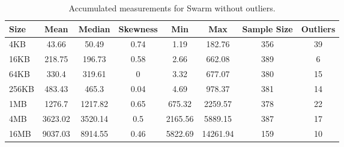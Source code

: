 \begin{table}[H]
\centering
\begin{small}
\caption{Accumulated measurements for Swarm without outliers.}
\begin{tabular}{@{}lccccccc@{}}
\toprule
Size & Mean & Median & Skewness & Min & Max & Sample Size & Outliers \\ \midrule
4KB & 43.66 & 50.49 & 0.74 & 1.19 & 182.76 & 356 & 39\\
16KB & 218.75 & 196.73 & 0.58 & 2.66 & 662.08 & 389 & 6\\
64KB & 330.4 & 319.61 & 0 & 3.32 & 677.07 & 380 & 15\\
256KB & 483.43 & 465.3 & 0.04 & 4.69 & 978.37 & 381 & 14\\
1MB & 1276.7 & 1217.82 & 0.65 & 675.32 & 2259.57 & 378 & 22\\
4MB & 3623.02 & 3520.14 & 0.5 & 2165.56 & 5889.15 & 387 & 17\\
16MB & 9037.03 & 8914.55 & 0.46 & 5822.69 & 14261.94 & 159 & 10\\
\bottomrule
\end{tabular}
\end{small}
\end{table}








